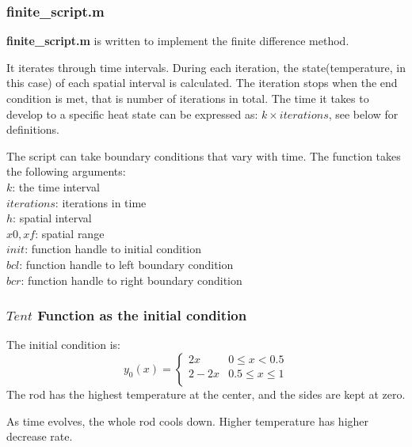 \documentclass[a4paper, 12pt]{article}
\begin{document}
\subsubsection{finite\_script.m}
\textbf{finite\_script.m} is written to implement the finite difference method.

It iterates through time intervals. During each iteration, the state(temperature, in this case) of each spatial interval is calculated. The iteration stops when the end condition is met, that is number of iterations in total. The time it takes to develop to a specific heat state can be expressed as: $k\times iterations$, see below for definitions.

The script can take boundary conditions that vary with time. The function takes the following arguments:\\
\indent \indent $k$: the time interval\\
\indent \indent $iterations$: iterations in time\\
\indent \indent $h$: spatial interval\\
\indent \indent $x0, xf$: spatial range\\
\indent \indent $init$: function handle to initial condition\\
\indent \indent $bcl$: function handle to left boundary condition\\
\indent \indent $bcr$: function handle to right boundary condition



\newpage
\subsubsection{$Tent$ Function as the initial condition}
The initial condition is:
\[ y_0(x)=
	\begin{cases} 
      2x & 0\leq x < 0.5 \\
      2-2x & 0.5\leq x\leq 1 \\
   \end{cases}
\]
The rod has the highest temperature at the center, and the sides are kept at zero.

As time evolves, the whole rod cools down. Higher temperature has higher decrease rate.
\end{document}
